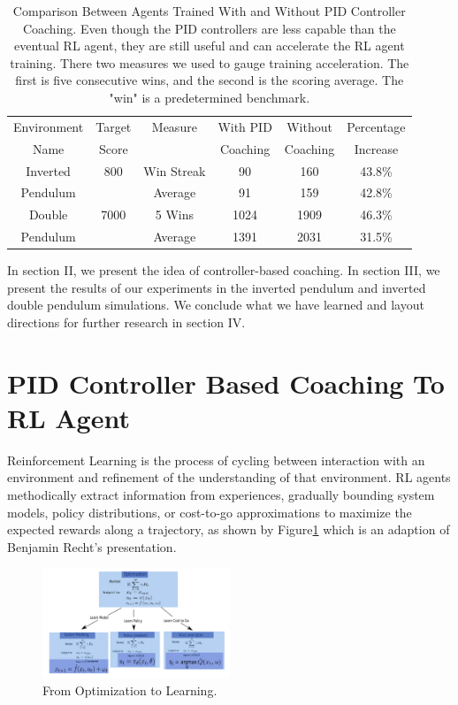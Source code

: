 \documentclass[journal]{IEEEtran}
\begin{document}
\begin{table}
\scriptsize
\caption{Comparison Between Agents Trained With and Without PID Controller Coaching. Even though the PID controllers are less capable than the eventual RL agent, they are still useful and can accelerate the RL agent training. There two measures we used to gauge training acceleration. The first is five consecutive wins, and the second is the scoring average. The "win" is a predetermined benchmark. }
\label{episode_compare}
\centering
\begin{tabular}{ cccccc }
\rowcolor{airforceblue}

Environment & Target & Measure  &  With PID  & Without  & Percentage\\
\rowcolor{airforceblue}

   Name     & Score  &              & Coaching  & Coaching  & Increase \\
\hline
Inverted & 800& Win Streak & 90 & 160&  43.8\% \\
Pendulum & &Average  & 91 &  159&  42.8\%\\
\rowcolor{beaublue}
Double & 7000& 5 Wins & 1024 & 1909&  46.3\%\\
\rowcolor{beaublue}
Pendulum & &Average & 1391 &  2031&  31.5\%\\

\end{tabular}
\end{table}

In section II, we present the idea of controller-based coaching. In section III, we present the results of our experiments in the inverted pendulum and inverted double pendulum simulations. We conclude what we have learned and layout directions for further research in section IV.

\section{PID Controller Based Coaching To RL Agent}

Reinforcement Learning is the process of cycling between interaction with an environment and refinement of the understanding of that environment. RL agents methodically extract information from experiences, gradually bounding system models, policy distributions, or cost-to-go approximations to maximize the expected rewards along a trajectory, as shown by Figure\ref{fig:rl} which is an adaption of Benjamin Recht's presentation\cite{Recht2018ATO}. 

\begin{figure}[H]
    \centering
    \includegraphics[width=0.5\textwidth]{Control.png}
    \caption{From Optimization to Learning.}
    \label{fig:rl}
\end{figure} 
\end{document}
